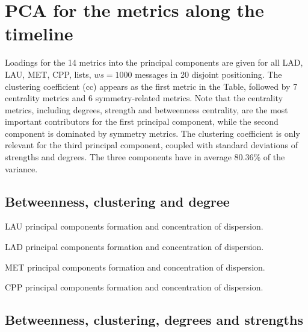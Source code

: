 \documentclass[%
	aip,
	jmp,%
	amsmath,amssymb,
	reprint,%
	floatfix,
]{revtex4-1}
\begin{document}
							\FloatBarrier
							\section{PCA for the metrics along the timeline}\label{si:pcat}
							Loadings for the 14 metrics into the principal components are given for all LAD, LAU, MET, CPP, lists, $ws=1000$ messages in 20 disjoint positioning. The clustering coefficient (cc) appears as the first metric in the Table, followed by 7 centrality metrics and 6 symmetry-related metrics. Note that the centrality metrics, including degrees, strength and betweenness centrality, are the most important contributors for the first principal component, while the second component is dominated by symmetry metrics. The clustering coefficient is only relevant for the third principal component, coupled with standard deviations of strengths and degrees. The three components have in average 80.36\% of the variance.
							\subsection{Betweenness, clustering and degree}

							\begin{table}[!h]
								\caption{LAU principal components formation and concentration of dispersion.}
								\footnotesize
								
								\label{tab:pcain}
							\end{table}

							\begin{table}[!h]
								\caption{LAD principal components formation and concentration of dispersion.}
								\footnotesize
								
								\label{tab:pcain}
							\end{table}

							\begin{table}[!h]
								\caption{MET principal components formation and concentration of dispersion.}
								\footnotesize
								
								\label{tab:pcain}
							\end{table}

							\begin{table}[!h]
								\caption{CPP principal components formation and concentration of dispersion.}
								\footnotesize
								
								\label{tab:pcain}
							\end{table}

							\FloatBarrier
							\subsection{Betweenness, clustering, degrees and strengths}
\end{document}
